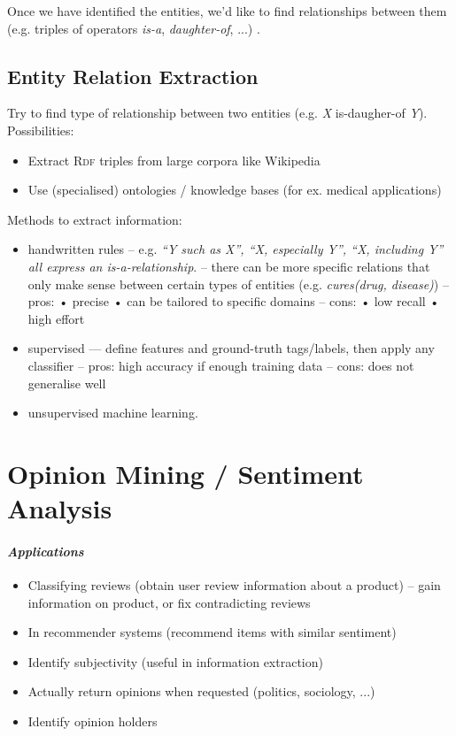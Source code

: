 \documentclass[10pt,twocolumn]{article}
\begin{document}
Once we have identified the entities, we'd like to find relationships between
them (e.g. triples of operators \textit{is-a}, \textit{daughter-of}, ...)
.

\subsection{Entity Relation Extraction}

Try to find type of relationship between two entities (e.g. \textit{X}
is-daugher-of \textit{Y}). Possibilities:
\begin{itemize}
\item Extract \textsc{Rdf} triples from large corpora like Wikipedia
\item Use (specialised) ontologies / knowledge bases (for ex. medical applications)
\end{itemize}
Methods to extract information:
\begin{itemize}
\item handwritten rules -- e.g. \textit{``Y such as X'', ``X, especially Y'',
    ``X, including Y'' all express an \textit{is-a}-relationship}. -- there can
  be more specific relations that only make sense between certain types of
  entities (e.g. \textit{cures(drug, disease)}) -- pros:  • precise  • can be
  tailored to specific domains -- cons:  • low recall  • high effort
\item supervised --- define features and ground-truth tags/labels, then apply any
  classifier -- pros: high accuracy if enough training data -- cons: does not
  generalise well
\item unsupervised machine learning.
\end{itemize}



\section{Opinion Mining / Sentiment Analysis}

\paragraph{\textit{Applications}}
\begin{itemize}
\item Classifying reviews (obtain user review information about a product) --
  gain information on product, or fix contradicting reviews
\item In recommender systems (recommend items with similar sentiment)
\item Identify subjectivity (useful in information extraction)
\item Actually return opinions when requested (politics, sociology, ...)
\item Identify opinion holders
\end{itemize}
\end{document}

